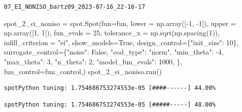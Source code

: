 \documentclass[
  letterpaper,
  DIV=11,
  numbers=noendperiod]{scrreprt}
\newenvironment{Shaded}{\begin{snugshade}}{\end{snugshade}}
\newcommand{\DecValTok}[1]{\textcolor[rgb]{0.68,0.00,0.00}{#1}}
\newcommand{\NormalTok}[1]{\textcolor[rgb]{0.00,0.23,0.31}{#1}}
\newcommand{\OperatorTok}[1]{\textcolor[rgb]{0.37,0.37,0.37}{#1}}
\newcommand{\StringTok}[1]{\textcolor[rgb]{0.13,0.47,0.30}{#1}}
\newcommand{\VariableTok}[1]{\textcolor[rgb]{0.07,0.07,0.07}{#1}}
\begin{document}
\begin{verbatim}
07_EI_NONISO_bartz09_2023-07-16_22-16-17
\end{verbatim}

\begin{Shaded}
\begin{Highlighting}[]
\NormalTok{spot\_2\_ei\_noniso }\OperatorTok{=}\NormalTok{ spot.Spot(fun}\OperatorTok{=}\NormalTok{fun,}
\NormalTok{                   lower }\OperatorTok{=}\NormalTok{ np.array([}\OperatorTok{{-}}\DecValTok{1}\NormalTok{, }\OperatorTok{{-}}\DecValTok{1}\NormalTok{]),}
\NormalTok{                   upper }\OperatorTok{=}\NormalTok{ np.array([}\DecValTok{1}\NormalTok{, }\DecValTok{1}\NormalTok{]),}
\NormalTok{                   fun\_evals }\OperatorTok{=} \DecValTok{25}\NormalTok{,}
\NormalTok{                   tolerance\_x }\OperatorTok{=}\NormalTok{ np.sqrt(np.spacing(}\DecValTok{1}\NormalTok{)),}
\NormalTok{                   infill\_criterion }\OperatorTok{=} \StringTok{"ei"}\NormalTok{,}
\NormalTok{                   show\_models}\OperatorTok{=}\VariableTok{True}\NormalTok{,}
\NormalTok{                   design\_control}\OperatorTok{=}\NormalTok{\{}\StringTok{"init\_size"}\NormalTok{: }\DecValTok{10}\NormalTok{\},}
\NormalTok{                   surrogate\_control}\OperatorTok{=}\NormalTok{\{}\StringTok{"noise"}\NormalTok{: }\VariableTok{False}\NormalTok{,}
                                      \StringTok{"cod\_type"}\NormalTok{: }\StringTok{"norm"}\NormalTok{,}
                                      \StringTok{"min\_theta"}\NormalTok{: }\OperatorTok{{-}}\DecValTok{4}\NormalTok{,}
                                      \StringTok{"max\_theta"}\NormalTok{: }\DecValTok{3}\NormalTok{,}
                                      \StringTok{"n\_theta"}\NormalTok{: }\DecValTok{2}\NormalTok{,}
                                      \StringTok{"model\_fun\_evals"}\NormalTok{: }\DecValTok{1000}\NormalTok{,}
\NormalTok{                                      \},}
\NormalTok{                    fun\_control}\OperatorTok{=}\NormalTok{fun\_control,)}
\NormalTok{spot\_2\_ei\_noniso.run()}
\end{Highlighting}
\end{Shaded}

\begin{verbatim}
spotPython tuning: 1.754686753274553e-05 [####------] 44.00% 
\end{verbatim}

\begin{verbatim}
spotPython tuning: 1.754686753274553e-05 [#####-----] 48.00% 
\end{verbatim}
\end{document}

